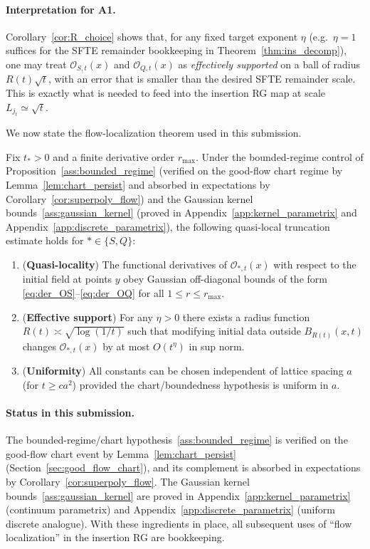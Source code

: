 \paragraph{Interpretation for A1.}
Corollary~\ref{cor:R_choice} shows that, for any fixed target exponent $\eta$ (e.g.\ $\eta=1$ suffices for the SFTE remainder bookkeeping in Theorem~\ref{thm:ins_decomp}), one may treat $\mathcal O_{S,t}(x)$ and $\mathcal O_{Q,t}(x)$ as \emph{effectively supported} on a ball of radius $R(t)\sqrt t$,
with an error that is smaller than the desired SFTE remainder scale.
This is exactly what is needed to feed into the insertion RG map at scale $L_{j_t}\simeq \sqrt t$.

We now state the flow-localization theorem used in this submission.

\begin{theorem}\label{thm:flow_local_v91}
Fix $t_\ast>0$ and a finite derivative order $r_{\max}$.
Under the bounded-regime control of Proposition~\ref{ass:bounded_regime}
(verified on the good-flow chart regime by Lemma~\ref{lem:chart_persist} and absorbed in expectations by Corollary~\ref{cor:superpoly_flow})
and the Gaussian kernel bounds~\ref{ass:gaussian_kernel}
(proved in Appendix~\ref{app:kernel_parametrix} and Appendix~\ref{app:discrete_parametrix}),
the following quasi-local truncation estimate holds for $*\in\{S,Q\}$:
\begin{enumerate}[label=(L\arabic*)]
\item (\textbf{Quasi-locality}) The functional derivatives of $\mathcal O_{*,t}(x)$ with respect to the initial field at points $y$ obey Gaussian off-diagonal bounds of the form
\eqref{eq:der_OS}--\eqref{eq:der_OQ} for all $1\le r\le r_{\max}$.
\item (\textbf{Effective support}) For any $\eta>0$ there exists a radius function $R(t)\asymp \sqrt{\log(1/t)}$ such that
modifying initial data outside $B_{R(t)}(x,t)$ changes $\mathcal O_{*,t}(x)$ by at most $O(t^{\eta})$ in sup norm.
\item (\textbf{Uniformity}) All constants can be chosen independent of lattice spacing $a$ (for $t\ge c a^2$) provided the chart/boundedness hypothesis is uniform in $a$.
\end{enumerate}
\end{theorem}

\paragraph{Status in this submission.}
The bounded-regime/chart hypothesis~\ref{ass:bounded_regime} is verified on the good-flow chart event by
Lemma~\ref{lem:chart_persist} (Section~\ref{sec:good_flow_chart}), and its complement is absorbed in expectations by
Corollary~\ref{cor:superpoly_flow}.
The Gaussian kernel bounds~\ref{ass:gaussian_kernel} are proved in Appendix~\ref{app:kernel_parametrix} (continuum parametrix)
and Appendix~\ref{app:discrete_parametrix} (uniform discrete analogue).
With these ingredients in place, all subsequent uses of ``flow localization'' in the insertion RG are bookkeeping.
